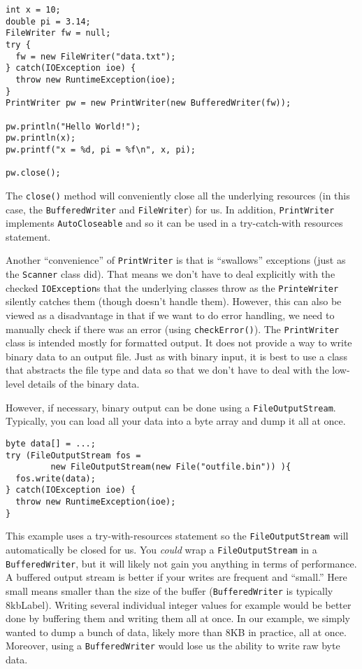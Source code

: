 \begin{verbatim}
int x = 10;
double pi = 3.14;
FileWriter fw = null;
try {
  fw = new FileWriter("data.txt");
} catch(IOException ioe) {
  throw new RuntimeException(ioe);
}
PrintWriter pw = new PrintWriter(new BufferedWriter(fw));

pw.println("Hello World!");
pw.println(x);
pw.printf("x = %d, pi = %f\n", x, pi);

pw.close();
\end{verbatim}

The \texttt{close()} method will conveniently
close all the underlying resources (in this case, the 
\texttt{BufferedWriter} and \texttt{FileWriter}) 
for us.  In addition, \texttt{PrintWriter}
implements \texttt{AutoCloseable} and so it can
be used in a try-catch-with resources statement.

Another ``convenience'' of \texttt{PrintWriter} is
that is ``swallows'' exceptions (just as the \texttt{Scanner}
class did).  That means we don't have to deal explicitly with
the checked \texttt{IOException}s that the
underlying classes throw as the \texttt{PrinteWriter}
silently catches them (though doesn't handle them).  However, 
this can also be viewed as a disadvantage in that if we want
to do error handling, we need to manually check if there was 
an error (using \texttt{checkError()}).
The \texttt{PrintWriter} class is intended mostly
for formatted output.  It does not provide a way to write
binary data to an output file.  Just as with binary input, 
it is best to use a class that abstracts the file type and
data so that we don't have to deal with the low-level details
of the binary data.

However, if necessary, binary output can be done using a
\texttt{FileOutputStream}.  Typically, you can
load all your data into a byte array and dump it all at
once.

\begin{verbatim}
byte data[] = ...;
try (FileOutputStream fos = 
         new FileOutputStream(new File("outfile.bin")) ){
  fos.write(data);
} catch(IOException ioe) {
  throw new RuntimeException(ioe);
}
\end{verbatim}

This example uses a try-with-resources statement
so the \texttt{FileOutputStream} will automatically
be closed for us. You \emph{could} wrap a \texttt{FileOutputStream} 
in a \texttt{BufferedWriter}, but it
will likely not gain you anything in terms of performance.  A
buffered output stream is better if your writes are 
frequent and ``small.'' Here small means smaller than
the size of the buffer (\texttt{BufferedWriter}
is typically 8\gls{kbLabel}).  Writing several individual
integer values for example would be better done by buffering
them and writing them all at once.  
In our example, we simply wanted to dump a bunch of data, 
likely more than 8KB in practice, all at once.  Moreover, 
using a \texttt{BufferedWriter} would lose us the
ability to write raw byte data.


